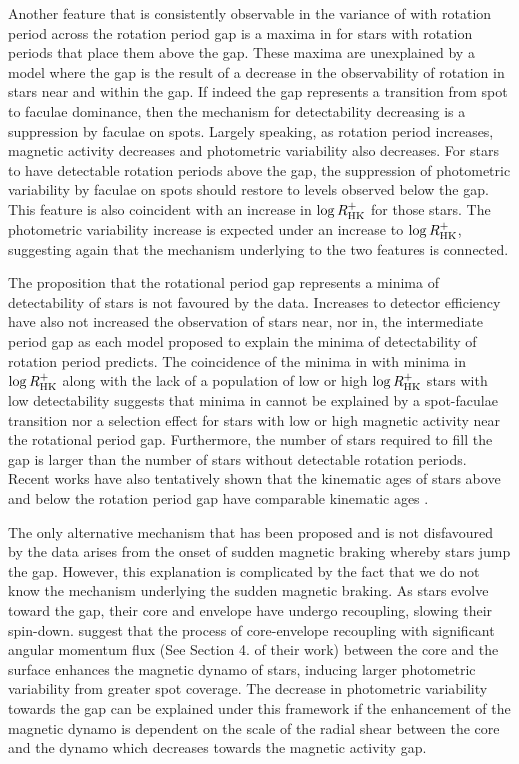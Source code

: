 Another feature that is consistently observable in the variance of \rper{} with rotation period across the rotation period gap is a maxima in \rper{} for stars with rotation periods that place them above the gap.
These maxima are unexplained by a model where the gap is the result of a decrease in the observability of rotation in stars near and within the gap.
If indeed the gap represents a transition from spot to faculae dominance, then the mechanism for detectability decreasing is a suppression \rper{} by faculae on spots.
Largely speaking, as rotation period increases, magnetic activity decreases and photometric variability also decreases.
For stars to have detectable rotation periods above the gap, the suppression of photometric variability by faculae on spots should restore \rper{} to levels observed below the gap.
This feature is also coincident with an increase in $\log R^{+}_{\rm{HK}}$ for those stars.
The photometric variability increase is expected under an increase to  $\log R^{+}_{\rm{HK}}$, suggesting again that the mechanism underlying to the two features is connected.

The proposition that the rotational period gap represents a minima of detectability of stars is not favoured by the data.
Increases to detector efficiency have also not increased the observation of stars near, nor in, the intermediate period gap as each model proposed to explain the minima of detectability of rotation period predicts.
The coincidence of the minima in \rper{} with minima in $\log R^{+}_{\rm{HK}}$ along with the lack of a population of low or high $\log R^{+}_{\rm{HK}}$ stars with low detectability suggests that minima in \rper{} cannot be explained by a spot-faculae transition nor a selection effect for stars with low or high magnetic activity near the rotational period gap.
Furthermore, the number of stars required to fill the gap is larger than the number of stars without detectable rotation periods.
Recent works have also tentatively shown that the kinematic ages of stars above and below the rotation period gap have comparable kinematic ages \citep{lu_bridging_2022}.

The only alternative mechanism that has been proposed and is not disfavoured by the data arises from the onset of sudden magnetic braking whereby stars jump the gap.
However, this explanation is complicated by the fact that we do not know the mechanism underlying the sudden magnetic braking.
As stars evolve toward the gap, their core and envelope have undergo recoupling, slowing their spin-down.
\citet{cao_core_2023} suggest that the process of core-envelope recoupling with significant angular momentum flux (See Section 4. of their work) between the core and the surface enhances the magnetic dynamo of stars, inducing larger photometric variability from greater spot coverage.
The decrease in photometric variability towards the gap can be explained under this framework if the enhancement of the magnetic dynamo is dependent on the scale of the radial shear between the core and the dynamo which decreases towards the magnetic activity gap.

